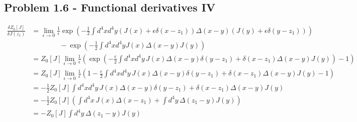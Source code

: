 \documentclass[10pt,a4paper]{book}
\theoremstyle{definition}
\begin{document}
\subsection{Problem 1.6 - Functional derivatives IV}
\begin{align}
\frac{\delta Z_0[J]}{\delta J(z_1)}
&=\lim_{\epsilon\rightarrow0}\frac{1}{\epsilon}\exp\left(-\frac{1}{2}\int d^4xd^4y(J(x)+\epsilon\delta(x-z_1))\Delta(x-y)(J(y)+\epsilon\delta(y-z_1))\right)\\
&\qquad\qquad-\exp\left(-\frac{1}{2}\int d^4xd^4yJ(x)\Delta(x-y)J(y)\right)\\
&=Z_0[J]\lim_{\epsilon\rightarrow0}\frac{1}{\epsilon}\left(\exp\left(-\frac{\epsilon}{2}\int d^4xd^4y\, J(x)\Delta(x-y)\delta(y-z_1)+\delta(x-z_1)\Delta(x-y)J(y)\right)-1\right)\\
&=Z_0[J]\lim_{\epsilon\rightarrow0}\frac{1}{\epsilon}\left(1-\frac{\epsilon}{2}\int d^4xd^4y\, J(x)\Delta(x-y)\delta(y-z_1)+\delta(x-z_1)\Delta(x-y)J(y)-1\right)\\
&=-\frac{1}{2}Z_0[J]\int d^4xd^4y\, J(x)\Delta(x-y)\delta(y-z_1)+\delta(x-z_1)\Delta(x-y)J(y)\\
&=-\frac{1}{2}Z_0[J]\left(\int d^4x\, J(x)\Delta(x-z_1)+\int d^4y\,\Delta(z_1-y)J(y)\right)\\
&=-Z_0[J]\int d^4y\,\Delta(z_1-y)J(y)
\end{align}
\end{document}
